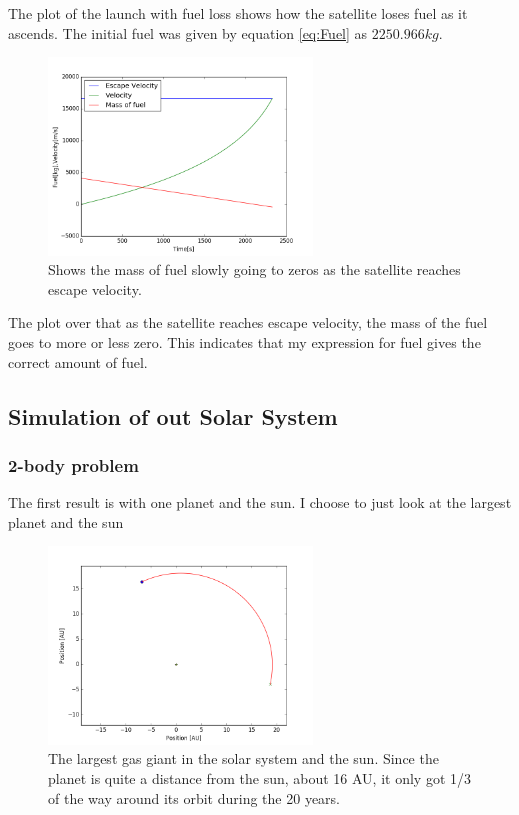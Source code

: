 \documentclass[a4paper, 10pt]{article}
\begin{document}
The plot of the launch with fuel loss shows how the satellite loses fuel as it ascends. The initial fuel was given by equation \ref{eq:Fuel} as $2250.966 kg$.


\begin{figure}[H]
\begin{center}
\includegraphics[width = 70mm]{part1launchVarMass.png}
\caption{Shows the mass of fuel slowly going to zeros as the satellite reaches escape velocity.}
\end{center}
\end{figure}

The plot over that as the satellite reaches escape velocity, the mass of the fuel goes to more or less zero. This indicates that my expression for fuel gives the correct amount of fuel.

\subsection{Simulation of out Solar System}
\subsubsection{2-body problem}

The first result is with one planet and the sun. I choose to just look at the largest planet and the sun


\begin{figure}[H]
\begin{center}
\includegraphics[width = 70mm]{part2onePlanet.png}
\caption{The largest gas giant in the solar system and the sun. Since the planet is quite a distance from the sun, about 16 AU, it only got 1/3 of the way around its orbit during the 20 years.}
\end{center}
\end{figure}
\end{document}
